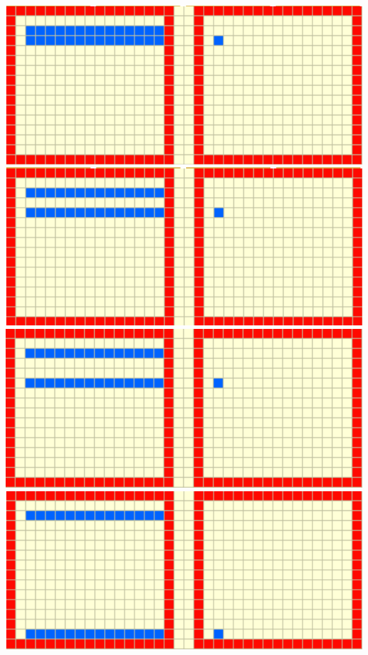 \documentclass{beamer}
\begin{document}
\begin{frame}
\begin{center}
\includegraphics[scale=0.2]{figures/lu3}
\hspace{1em}
\includegraphics[scale=0.2]{figures/lu4}
\hspace{1em}
\includegraphics[scale=0.2]{figures/lu2b}
\hspace{1em}
\includegraphics[scale=0.2]{figures/lu5}

\end{center}
\end{frame}
\end{document}
